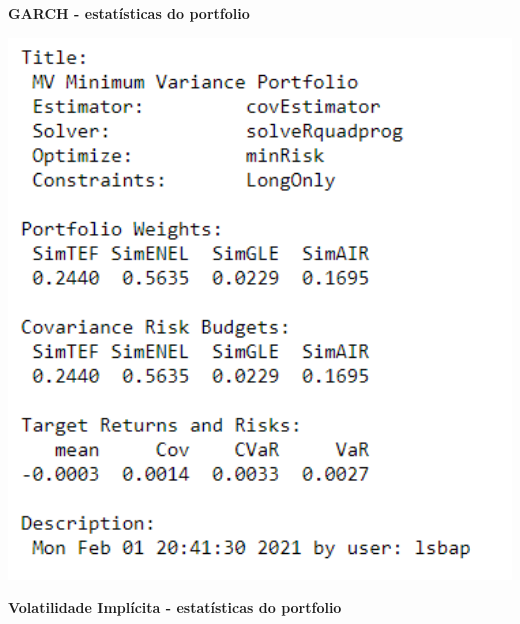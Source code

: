 \documentclass[
  12pt,
  a4paper,
  openany]{book}
\begin{document}
\begin{center}
 {\normalfont\Large\bfseries GARCH - estatísticas do portfolio}
\end{center}

\begin{center}
\begin{minipage}{0.90\linewidth}
    \centering
    \includegraphics[width=2\textwidth]{image/garchport.png}
\end{minipage}
\end{center}

\newpage

\begin{center}
 {\normalfont\Large\bfseries Volatilidade Implícita -  estatísticas do portfolio}
\end{center}
\end{document}
